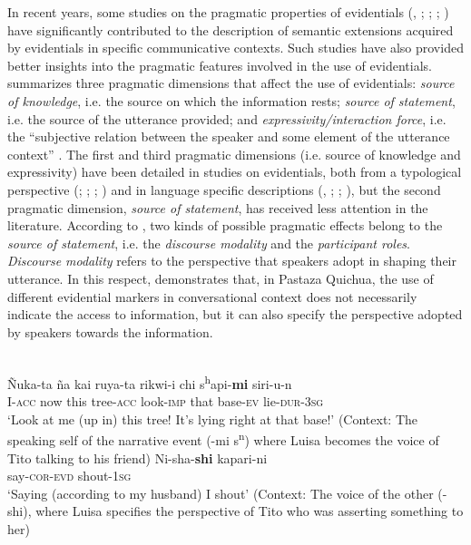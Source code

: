 \documentclass[output=paper]{langsci/langscibook}
\begin{document}
In recent years, some studies on the pragmatic properties of evidentials (\citealt{Curnow2002b}, \citeyear{Curnow2003}; \citealt{Clift2006}; \citealt{Faller2006};  \citealt{Hengeveld2015}) have significantly contributed to the description of semantic extensions acquired by evidentials in specific communicative contexts. Such studies have also provided better insights into the pragmatic features involved in the use of evidentials. \citet[172]{Hanks2012} summarizes three pragmatic dimensions that affect the use of evidentials: \textit{source of knowledge}, i.e. the source on which the information rests; \textit{source of statement}, i.e. the source of the utterance provided; and \textit{expressivity/interaction force}, i.e. the “subjective relation between the speaker and some element of the utterance context” \citep[174]{Hanks2012}. The first and third pragmatic dimensions (i.e. source of knowledge and expressivity) have been detailed in studies on evidentials, both from a typological perspective (\citealt{Willett1988}; \citealt{DeLancey1997}; \citealt{Plungian2001}; \citealt{Aikhenvald2004}) and in language specific descriptions (\citealt{Curnow2002b}, \citeyear{Curnow2003}; \citealt{Clift2006}; \citealt{Babel2009}), but the second pragmatic dimension, \textit{source of statement}, has received less attention in the literature. According to \citet[174]{Hanks2012}, two kinds of possible pragmatic effects belong to the \textit{source of statement}, i.e. the \textit{discourse modality} and the \textit{participant roles}. \textit{Discourse modality} refers to the perspective that speakers adopt in shaping their utterance. In this respect, \citet{Nuckolls2012} demonstrates that, in Pastaza Quichua, the use of different evidential markers in conversational context does not necessarily indicate the access to information, but it can also specify the perspective adopted by speakers towards the information.


\ea \label{ex:gq11}
\\
	\ea \label{ex:gq11a}
		\gll Ñuka-ta ña kai ruya-ta rikwi-i chi s\textsuperscript{h}api-\textbf{mi} siri-u-n\\
	I-\textsc{acc} now this tree-\textsc{acc} look-\textsc{imp} that base-\textsc{ev} lie-\textsc{dur-3sg}\\
	\glt ‘Look at me (up in) this tree! It’s lying right at that base!’ (Context: The speaking self of the narrative event (-mi s\textsuperscript{n}) where Luisa becomes the voice of Tito talking to his friend)
	\ex \label{ex:gq11b}
	\gll Ni-sha-\textbf{shi} kapari-ni\\
	say-\textsc{cor-evd} shout-\textsc{1sg}\\
	\glt ‘Saying (according to my husband) I shout’ (Context: The voice of the other (-shi), where Luisa specifies the perspective of Tito who was asserting something to her)
	\z
\z
\end{document}
